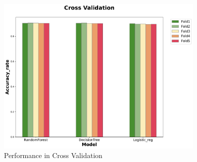 \documentclass[11pt,a4paper]{article}
\begin{document}
    
    \begin{figure}[!ht]
        \centering
        \includegraphics[width = 0.9\textwidth]{plot/classification/cv.pdf}
        \caption{Performance in Cross Validation}
        \label{fig:cv}
    \end{figure}
    
    






\end{document}
